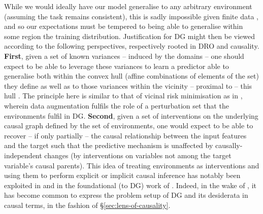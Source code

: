 %
While we would ideally have our model generalise to any arbitrary environment (assuming the task
remains consistent), this is sadly impossible given finite data \citep{david2010impossibility}, and
so our expectations must be tempered to being able to generalise within some region the training
distribution.
%
%
Justification for \ac{DG} might then be viewed according to the following perspectives,
respectively rooted in \ac{DRO} and causality. \textbf{First}, given a set of known variances --
induced by the domains -- one should expect to be able to leverage these variances to learn a
predictor able to generalise both within the convex hull (affine combinations of elements of the
set) they define as well as to those variances within the vicinity -- proximal to -- this hull
\citep{krueger2021out}.
The principle here is similar to that of vicinal risk minimisation \citep{chapelle2000vicinal} as
in \cite{zhang2017mixup}, wherein data augmentation fulfils the role of a perturbation set that the
environments fulfil in \ac{DG}.
%
\textbf{Second}, given a set of interventions on the underlying causal graph defined by the set of
environments, one would expect to be able to recover -- if only partially -- the causal
relationship between the input features and the target such that the predictive mechanism is
unaffected by causally-independent changes (by interventions on variables not among the target
variable's causal parents).
%
This idea of treating environments as interventions and using them to perform explicit or
implicit causal inference has notably been exploited in \cite{peters2016causal} and in the
foundational (to \ac{DG}) work of \cite{arjovsky2019invariant}.
%
Indeed, in the wake of \cite{arjovsky2019invariant}, it has become common \citep{
gulrajani2020search, krueger2021out, mahajan2021domain, lin2022zin} to express the problem setup of
\ac{DG} and its desiderata in causal terms, in the fashion of \S\ref{sec:lens-of-causality}.
%

